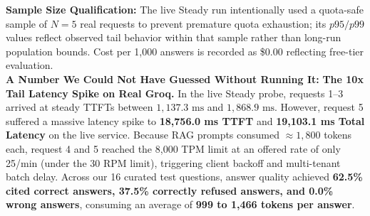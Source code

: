\documentclass[9pt,a4paper]{article}
\begin{document}
\vspace{2pt}
\noindent\textbf{Sample Size Qualification:} The live Steady run intentionally used a quota-safe sample of $N=5$ real requests to prevent premature quota exhaustion; its $p95/p99$ values reflect observed tail behavior within that sample rather than long-run population bounds. Cost per 1,000 answers is recorded as \$0.00 reflecting free-tier evaluation.\\
\textbf{A Number We Could Not Have Guessed Without Running It:}  
\textbf{The 10x Tail Latency Spike on Real Groq.} In the live Steady probe, requests 1--3 arrived at steady TTFTs between $1,137.3\text{ ms}$ and $1,868.9\text{ ms}$. However, request 5 suffered a massive latency spike to \textbf{18,756.0 ms TTFT} and \textbf{19,103.1 ms Total Latency} on the live service. Because RAG prompts consumed $\approx 1,800$ tokens each, request 4 and 5 reached the 8,000 TPM limit at an offered rate of only 25/min (under the 30 RPM limit), triggering client backoff and multi-tenant batch delay. Across our 16 curated test questions, answer quality achieved \textbf{62.5\% cited correct answers, 37.5\% correctly refused answers, and 0.0\% wrong answers}, consuming an average of \textbf{999 to 1,466 tokens per answer}.
\end{document}

